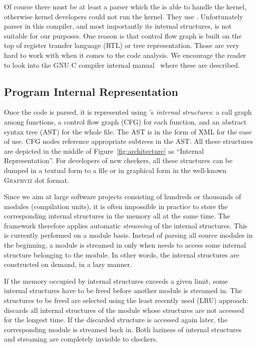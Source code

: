 Of course there must be at least a parser which the is able to handle the
kernel, otherwise kernel developers could not run the kernel. They use
\gcc.  Unfortunately parser in this compiler, and most importantly its
internal structures, is not suitable for our purposes. One reason is that
control flow graph is built on the top of register transfer language (RTL) or
tree representation. Those are very hard to work with when it comes to the
code analysis. We encourage the reader to look into the GNU C compiler
internal manual~\cite{gcc_intern} where these are described.

\subsection*{Program Internal Representation}

Once the code is parsed, it is represented using \stan's \emph{internal
structures}: a call graph among functions, a control flow graph (CFG) for each
function, and an abstract syntax tree (AST) for the whole file. The AST is in
the form of XML for the ease of use. CFG nodes reference appropriate subtrees
in the AST. All these structures are depicted in the middle of
Figure~\ref{fig:architecture} as ``Internal Representation''. For developers
of new checkers, all these structures can be dumped in a textual form to a
file or in graphical form in the well-known \textsc{Graphviz} dot format.

Since we aim at large software projects consisting of hundreds or thousands of
modules (compilation units), it is often impossible in practice to store the
corresponding internal structures in the memory all at the same time. The \stan
framework therefore applies automatic \emph{streaming} of the internal
structures. This is currently performed on a module basis. Instead of parsing
all source modules in the beginning, a module is streamed in only when \stan
needs to access some internal structure belonging to the module. In other
words, the internal structures are constructed on demand, in a lazy manner.

If the memory occupied by internal structures exceeds a given limit, some
internal structures have to be freed before another module is streamed in. The
structures to be freed are selected using the least recently used (LRU)
approach: \stan discards all internal structures of the module whose
structures are not accessed for the longest time. If the discarded structure
is accessed again later, the corresponding module is streamed back in. Both
laziness of internal structures and streaming are completely invisible to
checkers. 

